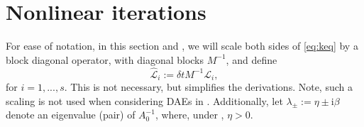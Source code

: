 \documentclass[review]{siamart}
\makeatletter
\newcommand{\todo}[1]{\textcolor{red}{[TODO\@: #1]}}
\makeatother
\begin{document}
\section{Nonlinear iterations}\label{sec:nonlinear}

For ease of notation, in this section and , we will scale
both sides of \eqref{eq:keq} by a block diagonal operator, with diagonal
blocks $M^{-1}$, and define
%
\begin{equation*}
\widehat{\mathcal{L}}_i := \delta t M^{-1}\mathcal{L}_i,
\end{equation*}
%
for $i=1,...,s$. This is not necessary, but simplifies the derivations. Note,
such a scaling is not used when considering DAEs in .
Additionally, let $\lambda_{\pm} := \eta \pm \mathrm{i}\beta$ denote an
eigenvalue (pair) of $A_0^{-1}$, where, under , $\eta > 0$.


\end{document}
